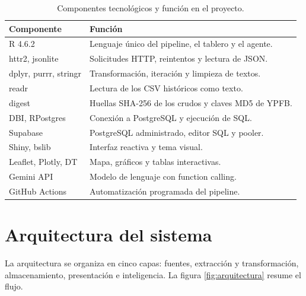 \documentclass[12pt,a4paper]{article}
\begin{document}
\begin{table}[H]
\centering
\small
\caption{Componentes tecnológicos y función en el proyecto.}
\label{tab:componentes}
\begin{tabularx}{\linewidth}{@{}l X@{}}
\toprule
\textbf{Componente} & \textbf{Función} \\
\midrule
R 4.6.2 & Lenguaje único del pipeline, el tablero y el agente. \\
httr2, jsonlite & Solicitudes HTTP, reintentos y lectura de JSON. \\
dplyr, purrr, stringr & Transformación, iteración y limpieza de textos. \\
readr & Lectura de los CSV históricos como texto. \\
digest & Huellas SHA-256 de los crudos y claves MD5 de YPFB. \\
DBI, RPostgres & Conexión a PostgreSQL y ejecución de SQL. \\
Supabase & PostgreSQL administrado, editor SQL y pooler. \\
Shiny, bslib & Interfaz reactiva y tema visual. \\
Leaflet, Plotly, DT & Mapa, gráficos y tablas interactivas. \\
Gemini API & Modelo de lenguaje con function calling. \\
GitHub Actions & Automatización programada del pipeline. \\
\bottomrule
\end{tabularx}
\end{table}

\section{Arquitectura del sistema}\label{sec:arquitectura}

La arquitectura se organiza en cinco capas: fuentes, extracción y transformación, almacenamiento, presentación e inteligencia. La figura \ref{fig:arquitectura} resume el flujo.
\end{document}
